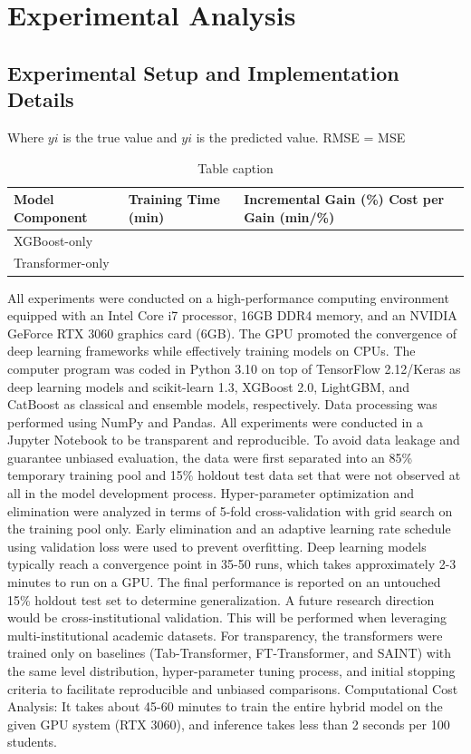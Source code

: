 \documentclass[twocolumn]{svjour3}
\begin{document}
\section{Experimental Analysis}
\subsection{Experimental Setup and Implementation Details}
Where $yi$ is the true value and $yi$ is the predicted value.
RMSE = MSE
\begin{table}
\centering
\caption{Table caption}
\begin{tabular}{lll}
\hline
Model Component & Training Time (min) & Incremental Gain (\%) Cost per Gain (min/\%) \\
\hline
XGBoost-only & & \\
Transformer-only & & \\
\hline
\end{tabular}
\end{table}
All experiments were conducted on a high-performance computing environment equipped with an Intel Core i7 processor, 16GB DDR4 memory, and an NVIDIA GeForce RTX 3060 graphics card (6GB). The GPU promoted the convergence of deep learning frameworks while effectively training models on CPUs. The computer program was coded in Python 3.10 on top of TensorFlow 2.12/Keras as deep learning models and scikit-learn 1.3, XGBoost 2.0, LightGBM, and CatBoost as classical and ensemble models, respectively. Data processing was performed using NumPy and Pandas. All experiments were conducted in a Jupyter Notebook to be transparent and reproducible.
To avoid data leakage and guarantee unbiased evaluation, the data were first separated into an 85\% temporary training pool and 15\% holdout test data set that were not observed at all in the model development process. Hyper-parameter optimization and elimination were analyzed in terms of 5-fold cross-validation with grid search on the training pool only. Early elimination and an adaptive learning rate schedule using validation loss were used to prevent overfitting. Deep learning models typically reach a convergence point in 35-50 runs, which takes approximately 2-3 minutes to run on a GPU. The final performance is reported on an untouched 15\% holdout test set to determine generalization. A future research direction would be cross-institutional validation. This will be performed when leveraging multi-institutional academic datasets. For transparency, the transformers were trained only on baselines (Tab-Transformer, FT-Transformer, and SAINT) with the same level distribution, hyper-parameter tuning process, and initial stopping criteria to facilitate reproducible and unbiased comparisons.
Computational Cost Analysis: It takes about 45-60 minutes to train the entire hybrid model on the given GPU system (RTX 3060), and inference takes less than 2 seconds per 100 students.
\end{document}
